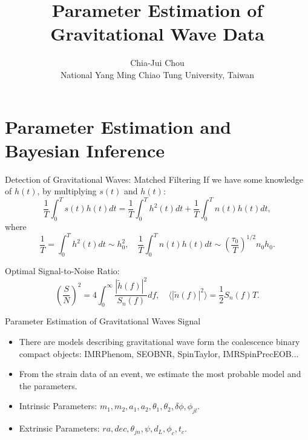 \documentclass[xcolor=dvipsnames]{beamer}
\title[Parameter Estimation of Gravitational Wave Data]
{Parameter Estimation of Gravitational Wave Data}
\author[Chia-Jui Chou]
{\Large{Chia-Jui Chou}\\
\small{National Yang Ming Chiao Tung University, Taiwan}}
\institute[2025/04/24]
{2023/04/24}
\date[2023/04/24]
{}
\begin{document}
\begin{frame}
  \titlepage
\end{frame}


\setcounter{equation}{0}
\renewcommand{\theequation}{\arabic{section}.\arabic{equation}}

\section[PE and Bayesian Inference]{Parameter Estimation and Bayesian Inference}

\begin{frame}[t]{Detection of Gravitational Waves: Matched Filtering}
  If we have some knowledge of $h(t)$, by multiplying $s(t)$ and $h(t)$:
  \begin{equation*}
    \frac{1}{T} \int_0^T s(t) h(t) dt = \frac{1}{T} \int_0^T h^2(t) dt + \frac{1}{T} \int_0^T n(t) h(t) dt,
  \end{equation*}
  where
  \begin{equation*}
    \frac{1}{T} = \int_0^T h^2(t) dt \sim h_0^2, \quad \frac{1}{T} \int_0^T n(t) h(t) dt \sim \left( \frac{\tau_0}{T} \right)^{1/2} n_0 h_0.
  \end{equation*}

  Optimal Signal-to-Noise Ratio:
  \begin{equation*}
    \left( \frac{S}{N} \right)^2 = 4 \int_0^\infty \frac{|\tilde{h}(f)|^2}{S_n(f)} df, \quad \langle |\tilde{n}(f)|^2 \rangle = \frac{1}{2} S_n(f) T.
  \end{equation*}
\end{frame}

\begin{frame}[t]{Parameter Estimation of Gravitational Waves Signal}
  \begin{itemize}
    \item There are models describing gravitational wave form the coalescence binary compact objects: IMRPhenom, SEOBNR, SpinTaylor, IMRSpinPrecEOB...
    \item From the strain data of an event, we estimate the most probable model and the parameters.
    \item Intrinsic Parameters: $m_1, m_2, a_1, a_2, \theta_1, \theta_2, \delta \phi, \phi_{jl}$.
    \item Extrinsic Parameters: $ra, dec, \theta_{jn}, \psi, d_L, \phi_c, t_c$.
  \end{itemize}
\end{frame}
\end{document}

